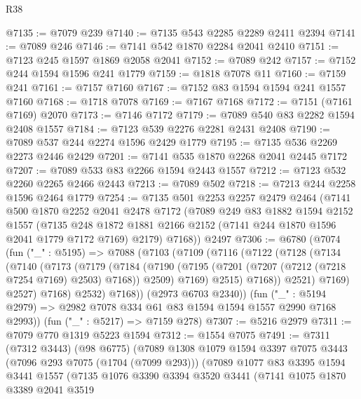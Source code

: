 \begin{lexlean}{R38}
\begin{coremodule}
@7135 := @7079 @239
@7140 := @7135 @543 @2285 @2289 @2411 @2394
@7141 := @7089 @246
@7146 := @7141 @542 @1870 @2284 @2041 @2410
@7151 := @7123 @245 @1597 @1869 @2058 @2041
@7152 := @7089 @242
@7157 := @7152 @244 @1594 @1596 @241 @1779
@7159 := @1818 @7078 @11
@7160 := @7159 @241
@7161 := @7157 @7160
@7167 := @7152 @83 @1594 @1594 @241 @1557 @7160
@7168 := @1718 @7078
@7169 := @7167 @7168
@7172 := @7151 (@7161 @7169) @2070
@7173 := @7146 @7172
@7179 := @7089 @540 @83 @2282 @1594 @2408 @1557
@7184 := @7123 @539 @2276 @2281 @2431 @2408
@7190 := @7089 @537 @244 @2274 @1596 @2429 @1779
@7195 := @7135 @536 @2269 @2273 @2446 @2429
@7201 := @7141 @535 @1870 @2268 @2041 @2445 @7172
@7207 := @7089 @533 @83 @2266 @1594 @2443 @1557
@7212 := @7123 @532 @2260 @2265 @2466 @2443
@7213 := @7089 @502
@7218 := @7213 @244 @2258 @1596 @2464 @1779
@7254 := @7135
    @501
    @2253
    @2257
    @2479
    @2464
    (@7141
      @500
      @1870
      @2252
      @2041
      @2478
      @7172
      (@7089
        @249
        @83
        @1882
        @1594
        @2152
        @1557
        (@7135 @248 @1872 @1881 @2166 @2152 (@7141 @244 @1870 @1596 @2041 @1779 @7172 @7169) @2179)
        @7168))
    @2497
@7306 := @6780
    (@7074
      (fun ("_" : @5195) =>
      @7088
        (@7103
          (@7109
            (@7116
              (@7122
                (@7128
                  (@7134
                    (@7140
                      (@7173
                        (@7179
                          (@7184
                            (@7190
                              (@7195 (@7201 (@7207 (@7212 (@7218 @7254 @7169) @2503) @7168)) @2509)
                              @7169)
                            @2515)
                          @7168))
                      @2521)
                    @7169)
                  @2527)
                @7168)
              @2532)
            @7168))
        (@2973 @6703 @2340))
      (fun ("_" : @5194 @2979) => @2982 @7078 @334 @61 @83 @1594 @1594 @1557 @2990 @7168 @2993))
    (fun ("_" : @5217) => @7159 @278)
@7307 := @5216 @2979
@7311 := @7079 @770 @1319 @5223 @1594
@7312 := @1554 @7075
@7491 := @7311
    (@7312 @3443)
    (@98 @6775)
    (@7089
      @1308
      @1079
      @1594
      @3397
      @7075
      @3443
      (@7096 @293 @7075 (@1704 (@7099 @293)))
      (@7089
        @1077
        @83
        @3395
        @1594
        @3441
        @1557
        (@7135
          @1076
          @3390
          @3394
          @3520
          @3441
          (@7141
            @1075
            @1870
            @3389
            @2041
            @3519

\end{coremodule}
\end{lexlean}
